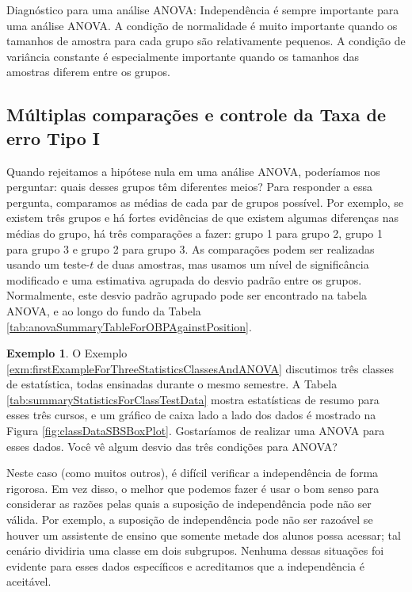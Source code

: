 \documentclass[
]{book}
\theoremstyle{definition}
\theoremstyle{definition}
\newtheorem{example}{Exemplo}[chapter]
\theoremstyle{definition}
\theoremstyle{definition}
\theoremstyle{remark}
\begin{document}
Diagnóstico para uma análise ANOVA: Independência é sempre importante para uma análise ANOVA. A condição de normalidade é muito importante quando os tamanhos de amostra para cada grupo são relativamente pequenos. A condição de variância constante é especialmente importante quando os tamanhos das amostras diferem entre os grupos.

\hypertarget{multipleComparisonsTypeIError}{%
\subsection{Múltiplas comparações e controle da Taxa de erro Tipo I}\label{multipleComparisonsTypeIError}}

Quando rejeitamos a hipótese nula em uma análise ANOVA, poderíamos nos perguntar: quais desses grupos têm diferentes meios? Para responder a essa pergunta, comparamos as médias de cada par de grupos possível. Por exemplo, se existem três grupos e há fortes evidências de que existem algumas diferenças nas médias do grupo, há três comparações a fazer: grupo 1 para grupo 2, grupo 1 para grupo 3 e grupo 2 para grupo 3. As comparações podem ser realizadas usando um teste-\(t\) de duas amostras, mas usamos um nível de significância modificado e uma estimativa agrupada do desvio padrão entre os grupos. Normalmente, este desvio padrão agrupado pode ser encontrado na tabela ANOVA, e ao longo do fundo da Tabela \ref{tab:anovaSummaryTableForOBPAgainstPosition}.

\begin{example}
\protect\hypertarget{exm:unnamed-chunk-225}{}{\label{exm:unnamed-chunk-225} }O Exemplo \ref{exm:firstExampleForThreeStatisticsClassesAndANOVA} discutimos três classes de estatística, todas ensinadas durante o mesmo semestre. A Tabela \ref{tab:summaryStatisticsForClassTestData} mostra estatísticas de resumo para esses três cursos, e um gráfico de caixa lado a lado dos dados é mostrado na Figura \ref{fig:classDataSBSBoxPlot}. Gostaríamos de realizar uma ANOVA para esses dados. Você vê algum desvio das três condições para ANOVA?
\end{example}

Neste caso (como muitos outros), é difícil verificar a independência de forma rigorosa. Em vez disso, o melhor que podemos fazer é usar o bom senso para considerar as razões pelas quais a suposição de independência pode não ser válida. Por exemplo, a suposição de independência pode não ser razoável se houver um assistente de ensino que somente metade dos alunos possa acessar; tal cenário dividiria uma classe em dois subgrupos. Nenhuma dessas situações foi evidente para esses dados específicos e acreditamos que a independência é aceitável.
\end{document}
